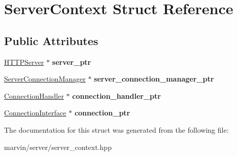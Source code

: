 \hypertarget{struct_server_context}{}\section{Server\+Context Struct Reference}
\label{struct_server_context}
\subsection*{Public Attributes}
\begin{DoxyCompactItemize}
\item 
\mbox{\label{struct_server_context_ae750155d467495cd07eb5abc04010ffc}} 
\hyperlink{class_h_t_t_p_server}{H\+T\+T\+P\+Server} $\ast$ {\bfseries server\+\_\+ptr}
\item 
\mbox{\label{struct_server_context_ae9559a8d8279579e8fa8d74149bf9afd}} 
\hyperlink{class_server_connection_manager}{Server\+Connection\+Manager} $\ast$ {\bfseries server\+\_\+connection\+\_\+manager\+\_\+ptr}
\item 
\mbox{\label{struct_server_context_a3a9fc04b2e2d874fbfe3582064a1f67d}} 
\hyperlink{class_connection_handler}{Connection\+Handler} $\ast$ {\bfseries connection\+\_\+handler\+\_\+ptr}
\item 
\mbox{\label{struct_server_context_ac94fa33cf25884ec14bb1ab887bfe973}} 
\hyperlink{class_connection_interface}{Connection\+Interface} $\ast$ {\bfseries connection\+\_\+ptr}
\end{DoxyCompactItemize}


The documentation for this struct was generated from the following file\+:\begin{DoxyCompactItemize}
\item 
marvin/server/server\+\_\+context.\+hpp\end{DoxyCompactItemize}

